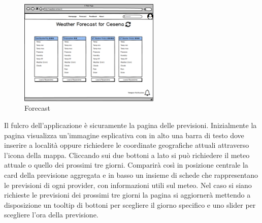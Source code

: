 \begin{figure}[H]
    \caption{Forecast}
    \label{fig:Home}
    \centering
    \includegraphics[width=0.6\textwidth]{MockUps/forecast.png}
\end{figure}
Il fulcro dell'applicazione è sicuramente la pagina delle previsioni. Inizialmente la pagina visualizza un'immagine esplicativa con in alto una barra di testo dove inserire a località oppure richiedere le coordinate geografiche attuali attraverso l'icona della mappa. Cliccando sui due bottoni a lato si può richiedere il meteo attuale o quello dei prossimi tre giorni. Comparirà così  in posizione centrale la card della previsione aggregata e in basso un insieme di schede che rappresentano le previsioni di ogni provider, con informazioni utili sul meteo.
 Nel caso si siano richieste le previsioni dei prossimi tre giorni la pagina si aggiornerà mettendo a disposizione un tooltip di bottoni per scegliere il giorno specifico e uno slider per scegliere l'ora della previsione.


